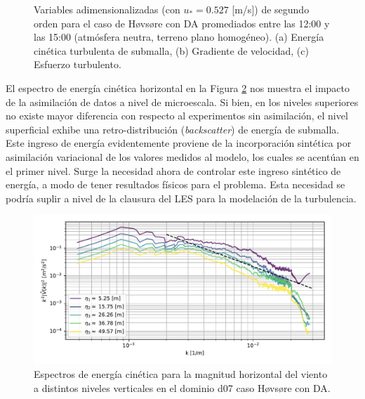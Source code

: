 \begin{figure}[H]
\begin{center}
	\end{center}
	\caption{Variables adimensionalizadas (con $u_* = 0.527$ [m/s]) de segundo orden para el caso de Høvsøre con DA promediados entre las 12:00 y las 15:00 (atmósfera neutra, terreno plano homogéneo). (a) Energía cinética turbulenta de submalla, (b) Gradiente de velocidad, (c) Esfuerzo turbulento. }
	\label{fig:06_hov_da_mean_secondorder}
\end{figure}

El espectro de energía cinética horizontal en la Figura \ref{fig:06_hov_da_spectrum} nos muestra el impacto de la asimilación de datos a nivel de microescala. Si bien, en los niveles superiores no existe mayor diferencia con respecto al experimentos sin asimilación, el nivel superficial exhibe una retro-distribución (\emph{backscatter}) de energía de submalla. Este ingreso de energía evidentemente proviene de la incorporación sintética por asimilación variacional de los valores medidos al modelo, los cuales se acentúan en el primer nivel. Surge la necesidad ahora de controlar este ingreso sintético de energía, a modo de tener resultados físicos para el problema. Esta necesidad se podría suplir a nivel de la clausura del LES para la modelación de la turbulencia.

\begin{figure}[H]
	\centering
	\includegraphics[width=1.0\linewidth,page=1,trim={3mm 5mm 3mm 3mm},clip]{Imagenes/06/hov_da/spectra}%
	\caption{Espectros de energía cinética para la magnitud horizontal del viento a distintos niveles verticales en el dominio d07 caso Høvsøre con DA.}
	\label{fig:06_hov_da_spectrum}
\end{figure}

